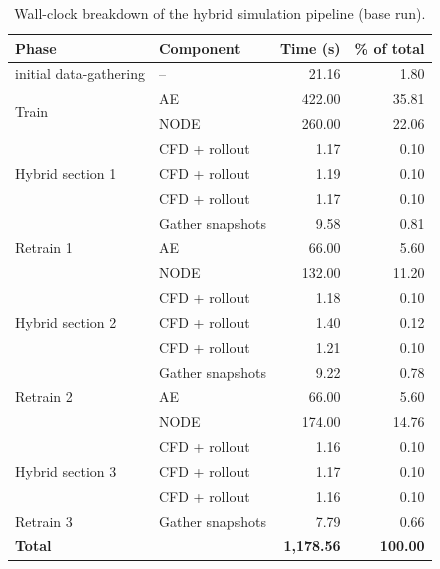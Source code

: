 \begin{table}[htp]
    \centering
    \begin{tabular}{llrr}
        \toprule
        \textbf{Phase} & \textbf{Component} & \textbf{Time (s)} &\textbf{ \% of total} \\
        \midrule
        initial data-gathering & -- & 21.16 & 1.80 \\
        \midrule
        \multirow{2}{*}{Train} & AE   & 422.00 & 35.81 \\
                               & NODE & 260.00 & 22.06 \\
        \midrule
        \multirow{3}{*}{Hybrid section 1} & CFD + rollout & 1.17 & 0.10 \\
                                          & CFD + rollout & 1.19 & 0.10 \\
                                          & CFD + rollout & 1.17 & 0.10 \\
        \midrule
        \multirow{3}{*}{Retrain 1} & Gather snapshots & 9.58   & 0.81 \\
                                   & AE               & 66.00  & 5.60 \\
                                   & NODE             & 132.00 & 11.20 \\
        \midrule
        \multirow{3}{*}{Hybrid section 2} & CFD + rollout & 1.18 & 0.10 \\
                                          & CFD + rollout & 1.40 & 0.12 \\
                                          & CFD + rollout & 1.21 & 0.10 \\
        \midrule
        \multirow{3}{*}{Retrain 2} & Gather snapshots & 9.22   & 0.78 \\
                                   & AE               & 66.00  & 5.60 \\
                                   & NODE             & 174.00 & 14.76 \\
        \midrule
        \multirow{3}{*}{Hybrid section 3} & CFD + rollout & 1.16 & 0.10 \\
                                          & CFD + rollout & 1.17 & 0.10 \\
                                          & CFD + rollout & 1.16 & 0.10 \\
        \midrule
        Retrain 3 & Gather snapshots & 7.79 & 0.66 \\
        \midrule
        \textbf{Total} & & \textbf{1,178.56} & \textbf{100.00} \\
        \bottomrule
    \end{tabular}
    \caption{Wall-clock breakdown of the hybrid simulation pipeline (base run).}
    \label{tab: wall_timing_hybrid}
\end{table}

